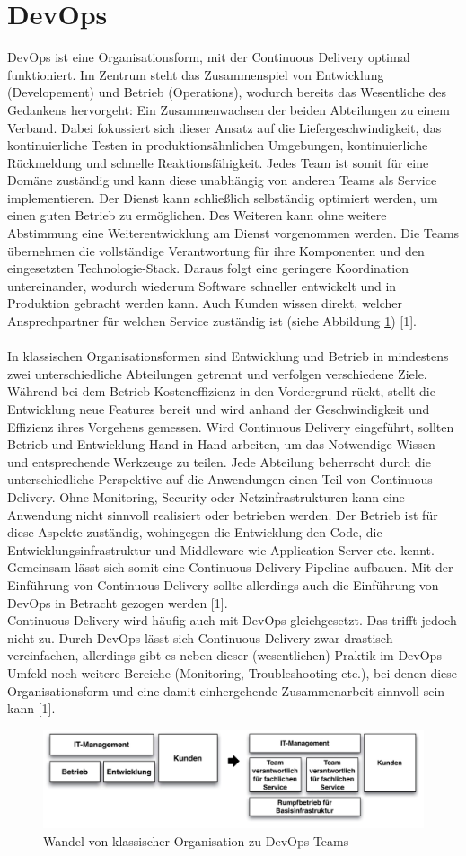 \section{DevOps}
DevOps ist eine Organisationsform, mit der Continuous Delivery optimal funktioniert. Im Zentrum steht das Zusammenspiel von Entwicklung (Developement) und Betrieb (Operations), wodurch bereits das Wesentliche des Gedankens hervorgeht: Ein Zusammenwachsen der beiden Abteilungen zu einem Verband. Dabei fokussiert sich dieser Ansatz auf die Liefergeschwindigkeit, das kontinuierliche Testen in produktionsähnlichen Umgebungen, kontinuierliche Rückmeldung und schnelle Reaktionsfähigkeit. Jedes Team ist somit für eine Domäne zuständig und kann diese unabhängig von anderen Teams als Service implementieren. Der Dienst kann schließlich selbständig optimiert werden, um einen guten Betrieb zu ermöglichen. Des Weiteren kann ohne weitere Abstimmung eine Weiterentwicklung am Dienst vorgenommen werden. Die Teams übernehmen die vollständige Verantwortung für ihre Komponenten und den eingesetzten Technologie-Stack. Daraus folgt eine geringere Koordination untereinander, wodurch wiederum Software schneller entwickelt und in Produktion gebracht werden kann. Auch Kunden wissen direkt, welcher Ansprechpartner für welchen Service zuständig ist (siehe Abbildung \ref{fig:devops}) [1].\\ \\
In klassischen Organisationsformen sind Entwicklung und Betrieb in mindestens zwei unterschiedliche Abteilungen getrennt und verfolgen verschiedene Ziele. Während bei dem Betrieb Kosteneffizienz in den Vordergrund rückt, stellt die Entwicklung neue Features bereit und wird anhand der Geschwindigkeit und Effizienz ihres Vorgehens gemessen. Wird Continuous Delivery eingeführt, sollten Betrieb und Entwicklung Hand in Hand arbeiten, um das Notwendige Wissen und entsprechende Werkzeuge zu teilen. Jede Abteilung beherrscht durch die unterschiedliche Perspektive auf die Anwendungen einen Teil von Continuous Delivery. Ohne Monitoring, Security oder Netzinfrastrukturen kann eine Anwendung nicht sinnvoll realisiert oder betrieben werden. Der Betrieb ist für diese Aspekte zuständig, wohingegen die Entwicklung den Code, die Entwicklungsinfrastruktur und Middleware wie Application Server etc. kennt. Gemeinsam lässt sich somit eine Continuous-Delivery-Pipeline aufbauen. Mit der Einführung von Continuous Delivery sollte allerdings auch die Einführung von DevOps in Betracht gezogen werden [1].\\
Continuous Delivery wird häufig auch mit DevOps gleichgesetzt. Das trifft jedoch nicht zu. Durch DevOps lässt sich Continuous Delivery zwar drastisch vereinfachen, allerdings gibt es neben dieser (wesentlichen) Praktik im DevOps-Umfeld noch weitere Bereiche (Monitoring, Troubleshooting etc.), bei denen diese Organisationsform und eine damit einhergehende Zusammenarbeit sinnvoll sein kann [1].
\begin{figure}[h!]
	\centering
	\includegraphics[width=0.8\linewidth]{images/devops}
	\caption{Wandel von klassischer Organisation zu DevOps-Teams} %
	\label{fig:devops}
\end{figure}
